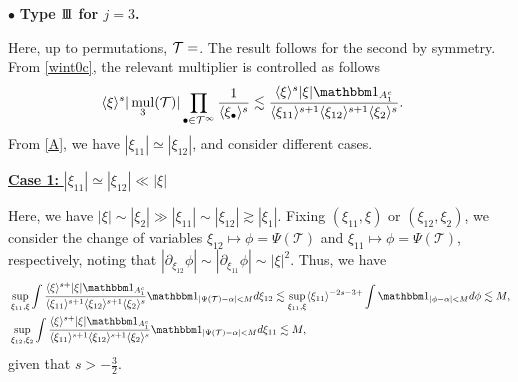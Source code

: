 \documentclass[%
11pt,  reqno]{amsart}
\makeatletter
\newcommand{\III}{\textup{I \hspace{-2.9mm} I \hspace{-2.9mm} I}}
\newcommand{\5}{\textup{V}}
\newcommand{\noi}{\noindent}
\newcommand{\ind}{\mathbbm 1}
\newcommand{\les}{\lesssim}
\theoremstyle{remark}
\newcommand{\bul}{\bullet}
\newcommand{\TT}{\mathcal{T}}
\newcommand{\al}{\alpha}
\newcommand{\sbf}{\mathbf{s}}
\newcommand{\ges}{\gtrsim}
\newcommand{\jb}[1]
{\langle #1 \rangle}
\DeclareMathOperator{\mul}{mul}
\def\<#1>{\csname MH@symb@#1\endcsname}
\numberwithin{equation}{section}
\numberwithin{theorem}{section}
\makeatother
\begin{document}




\smallskip 

\noi
$\bul$ \textbf{Type $\III$ for $j=3$.}


Here, up to permutations, $\TT=\<21>$. The result follows for the second by symmetry. 
From \eqref{wint0c}, the relevant multiplier is controlled as follows
\begin{align}
    \jb{\xi}^s | \mul_3 (\TT)| 
    \prod_{\bul \in \TT^\infty} \frac{1}{\jb{\xi_\bul}^s}
    &
    \les 
    \frac{\jb{\xi}^{s} |\xi|  \ind_{A_1^c} }{ \jb{\xi_{11}}^{s+1} \jb{\xi_{12}}^{s+1} \jb{\xi_{2}}^s}
    .
\end{align}
 From \eqref{A}, we have $|\xi_{11}| \simeq |\xi_{12}|$, and consider different cases.


\smallskip
\noi
\underline{\textbf{Case 1:} $|\xi_{11}| \simeq |\xi_{12}| \ll |\xi|$}

Here, we have $|\xi| \sim |\xi_2| \gg |\xi_{11}| \sim |\xi_{12}| \ges |\xi_1|$.
Fixing $(\xi_{11},\xi)$ or $(\xi_{12}, \xi_2)$, we consider the change of variables $\xi_{12} \mapsto \phi = \Psi(\TT)$ and $\xi_{11} \mapsto \phi = \Psi(\TT)$, respectively, noting that $|\partial_{\xi_{12}} \phi| \sim |\partial_{\xi_{11}} \phi| \sim |\xi|^2 $. Thus, we have
\begin{align}
&
    \sup_{\xi_{11}, \xi} 
    \int 
    \frac{\jb{\xi}^{s+} |\xi|  \ind_{A_1^c} }{ \jb{\xi_{11}}^{s+1} \jb{\xi_{12}}^{s+1} \jb{\xi_{2}}^s}
    \ind_{|\Psi(\TT)- \al | < M } d\xi_{12}
    \les 
    \sup_{\xi_{11},\xi} \jb{\xi_{11}}^{-2s -3 +} \int \ind_{|\phi-\al|<M} d\phi \les M 
    , 
    \\
    &
    \sup_{\xi_{12}, \xi_2} 
    \int 
    \frac{\jb{\xi}^{s+} |\xi|  \ind_{A_1^c} }{ \jb{\xi_{11}}^{s+1} \jb{\xi_{12}}^{s+1} \jb{\xi_{2}}^s}
    \ind_{|\Psi(\TT)- \al | < M } d\xi_{11}
    \les M , 
\end{align}
given that $s>-\frac32$. 
\end{document}
